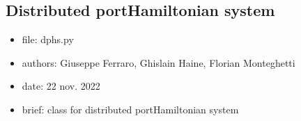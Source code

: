 \documentclass[letterpaper,10pt,english]{sphinxmanual}
\begin{document}
\subsection{Distributed port\sphinxhyphen{}Hamiltonian system}
\label{\detokenize{scrimp:module-scrimp.dphs}}\label{\detokenize{scrimp:distributed-port-hamiltonian-system}}\begin{itemize}
\item {} 
\sphinxAtStartPar
file:             dphs.py

\item {} 
\sphinxAtStartPar
authors:          Giuseppe Ferraro, Ghislain Haine, Florian Monteghetti

\item {} 
\sphinxAtStartPar
date:             22 nov. 2022

\item {} 
\sphinxAtStartPar
brief:            class for distributed port\sphinxhyphen{}Hamiltonian system

\end{itemize}
\end{document}
